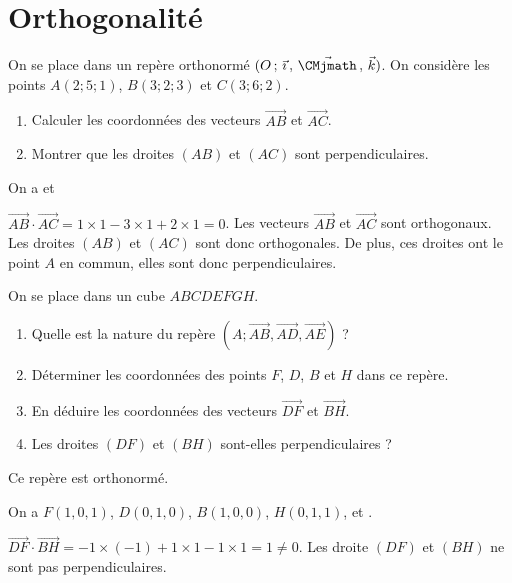 \documentclass[11pt,fleqn, openany]{book} %
\begin{document}

\section*{Orthogonalité}

\begin{exercise}[topic=geom13]On se place dans un repère orthonormé $\Oijk$. On considère les points $A(2;5;1)$, $B(3;2;3)$ et $C(3;6;2)$.
\begin{enumerate}
\item Calculer les coordonnées des vecteurs $\overrightarrow{AB}$ et $\overrightarrow{AC}$.
\item Montrer que les droites $(AB)$ et $(AC)$ sont perpendiculaires.
\end{enumerate}\end{exercise}

\begin{solution}On a  et 

$\overrightarrow{AB} \cdot \overrightarrow{AC}= 1\times 1 -3 \times 1 +2 \times 1 =0$. Les vecteurs $\overrightarrow{AB}$ et $\overrightarrow{AC}$ sont orthogonaux. Les droites $(AB)$ et $(AC)$ sont donc orthogonales. De plus, ces droites ont le point $A$ en commun, elles sont donc perpendiculaires.\end{solution}

%

\begin{exercise}[topic=geom13]On se place dans un cube $ABCDEFGH$.
\begin{enumerate}
\item Quelle est la nature du repère $(A;\overrightarrow{AB},\overrightarrow{AD},\overrightarrow{AE})$ ?
\item Déterminer les coordonnées des points $F$, $D$, $B$ et $H$ dans ce repère.
\item En déduire les coordonnées des vecteurs $\overrightarrow{DF}$ et $\overrightarrow{BH}$.
\item Les droites $(DF)$ et $(BH)$ sont-elles perpendiculaires ?
\end{enumerate}\end{exercise}

\begin{solution}Ce repère est orthonormé.

On a $F(1,0,1)$, $D(0,1,0)$, $B(1,0,0)$, $H(0,1,1)$,  et .

 $\overrightarrow{DF}\cdot \overrightarrow{BH}=-1\times (-1) + 1 \times 1 -1\times 1 = 1 \neq 0$. Les droite $(DF)$ et $(BH)$ ne sont pas perpendiculaires.\end{solution}
 
\end{document}

